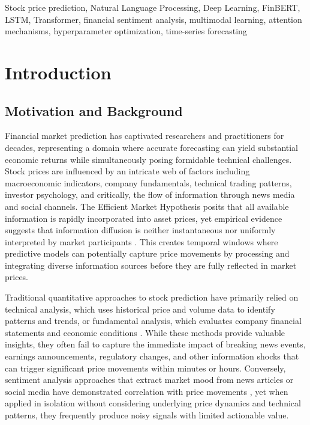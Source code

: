 \documentclass[conference]{IEEEtran}
\begin{document}
\begin{IEEEkeywords}
Stock price prediction, Natural Language Processing, Deep Learning, FinBERT, LSTM, Transformer, financial sentiment analysis, multimodal learning, attention mechanisms, hyperparameter optimization, time-series forecasting
\end{IEEEkeywords}

\section{Introduction}

\subsection{Motivation and Background}

Financial market prediction has captivated researchers and practitioners for decades, representing a domain where accurate forecasting can yield substantial economic returns while simultaneously posing formidable technical challenges. Stock prices are influenced by an intricate web of factors including macroeconomic indicators, company fundamentals, technical trading patterns, investor psychology, and critically, the flow of information through news media and social channels. The Efficient Market Hypothesis posits that all available information is rapidly incorporated into asset prices, yet empirical evidence suggests that information diffusion is neither instantaneous nor uniformly interpreted by market participants \cite{fama1970efficient}. This creates temporal windows where predictive models can potentially capture price movements by processing and integrating diverse information sources before they are fully reflected in market prices.

Traditional quantitative approaches to stock prediction have primarily relied on technical analysis, which uses historical price and volume data to identify patterns and trends, or fundamental analysis, which evaluates company financial statements and economic conditions \cite{lo2000foundations}. While these methods provide valuable insights, they often fail to capture the immediate impact of breaking news events, earnings announcements, regulatory changes, and other information shocks that can trigger significant price movements within minutes or hours. Conversely, sentiment analysis approaches that extract market mood from news articles or social media have demonstrated correlation with price movements \cite{bollen2011twitter}, yet when applied in isolation without considering underlying price dynamics and technical patterns, they frequently produce noisy signals with limited actionable value.
\end{document}
